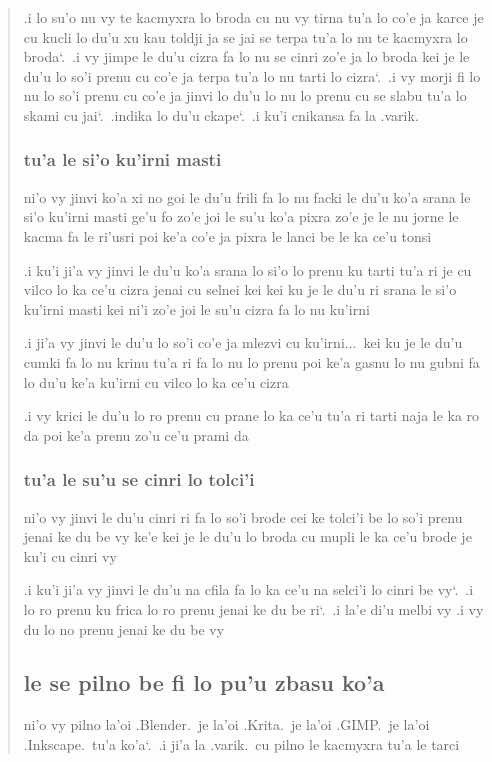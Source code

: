 \documentclass{report}
\newcommand\sds{\spacefactor\sfcode`.\ \space}
\begin{document}
\begin{quote}
	.i lo su'o nu vy te kacmyxra lo broda cu nu vy tirna tu'a lo co'e ja karce je cu kucli lo du'u xu kau toldji ja se jai se terpa tu'a lo nu te kacmyxra lo broda\sds .i vy jimpe le du'u cizra fa lo nu se cinri zo'e ja lo broda kei je le du'u lo so'i prenu cu co'e ja terpa tu'a lo nu tarti lo cizra\sds .i vy morji fi lo nu lo so'i prenu cu co'e ja jinvi lo du'u lo nu lo prenu cu se slabu tu'a lo skami cu jai\sds .indika lo du'u ckape\sds .i ku'i cnikansa fa la .varik.

	\subsubsection{tu'a le si'o ku'irni masti}
	ni'o vy jinvi ko'a xi no goi le du'u frili fa lo nu facki le du'u ko'a srana le si'o ku'irni masti ge'u fo zo'e joi le su'u ko'a pixra zo'e je le nu jorne le kacma fa le ri'usri poi ke'a co'e ja pixra le lanci be le ka ce'u tonsi

	.i ku'i ji'a vy jinvi le du'u ko'a srana lo si'o lo prenu ku tarti tu'a ri je cu vilco lo ka ce'u cizra jenai cu selnei kei kei ku je le du'u ri srana le si'o ku'irni masti kei ni'i zo'e joi le su'u cizra fa lo nu ku'irni

	.i ji'a vy jinvi le du'u lo so'i co'e ja mlezvi cu ku'irni...\ kei ku je le du'u cumki fa lo nu krinu tu'a ri fa lo nu lo prenu poi ke'a gasnu lo nu gubni fa lo du'u ke'a ku'irni cu vilco lo ka ce'u cizra

	.i vy krici le du'u lo ro prenu cu prane lo ka ce'u tu'a ri tarti naja le ka ro da poi ke'a prenu zo'u ce'u prami da

	\subsubsection{tu'a le su'u se cinri lo tolci'i}
	ni'o vy jinvi le du'u cinri ri fa lo so'i brode cei ke tolci'i be lo so'i prenu jenai ke du be vy ke'e kei je le du'u lo broda cu mupli le ka ce'u brode je ku'i cu cinri vy

	.i ku'i ji'a vy jinvi le du'u na cfila fa lo ka ce'u na selci'i lo cinri be vy\sds .i lo ro prenu ku frica lo ro prenu jenai ke du be ri\sds .i la'e di'u melbi vy
	.i vy du lo no prenu jenai ke du be vy

	\subsection{le se pilno be fi lo pu'u zbasu ko'a}
	ni'o vy pilno la'oi .Blender.\ je la'oi .Krita.\ je la'oi .GIMP.\ je la'oi .Inkscape.\ tu'a ko'a\sds .i ji'a la .varik.\ cu pilno le kacmyxra tu'a le tarci


\end{quote}
\end{document}
